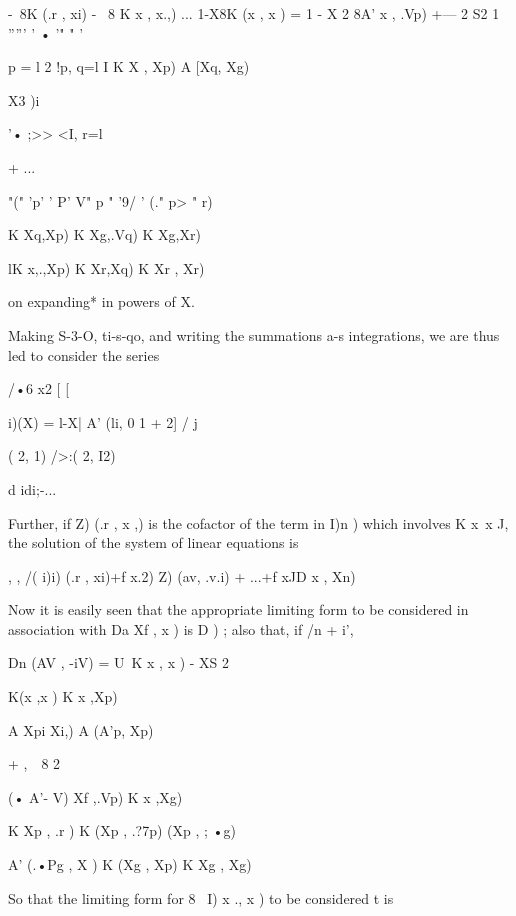 -\ 8K (.r , xi) - \ 8 K x , x.,) ... 1-X8K (x , x ) = 1 - X 2 8A' x ,
.Vp) +— 2 S2 1 ''''' ' • '" " '

p = l 2 !p, q=l I K X , Xp) A [Xq, Xg)



X3 )i

'• ;>> <I, r=l



+ ...



 "(" 'p' ' P' V" p " '9/ ' (." p> " r)

K Xq,Xp) K Xg,.Vq) K Xg,Xr)

lK x,.,Xp) K Xr,Xq) K Xr , Xr)

on expanding* in powers of X.

Making S-3-O, ti-s-qo, and writing the summations a-s integrations, we
are thus led to consider the series



/•6 x2 [ [

i)(X) = l-X| A' (li, 0 1 + 2] / j



 ( 2, 1) />:( 2, I2)



d idi;-...



Further, if Z) (.r , x ,) is the cofactor of the term in I)n ) which
involves K x\, x J, the solution of the system of linear equations is

, , /( i)i) (.r , xi)+f x.2) Z) (av, .v.i) + ...+f xJD x , Xn)

Now it is easily seen that the appropriate limiting form to be
considered in association with Da Xf , x ) is D ) ; also that, if /n +
i',



Dn (AV , -iV) = U\ K x , x ) - XS 2



K(x ,x ) K x ,Xp)

A Xpi Xi,) A (A'p, Xp)



+ ,\ \ 8 2



 (• A'- V) Xf ,.Vp) K x ,Xg)

K Xp , .r ) K (Xp , .?7p) (Xp , ; •g)

A' (.•Pg , X ) K (Xg , Xp) K Xg , Xg)

So that the limiting form for 8~ I) x ., x ) to be considered t is



